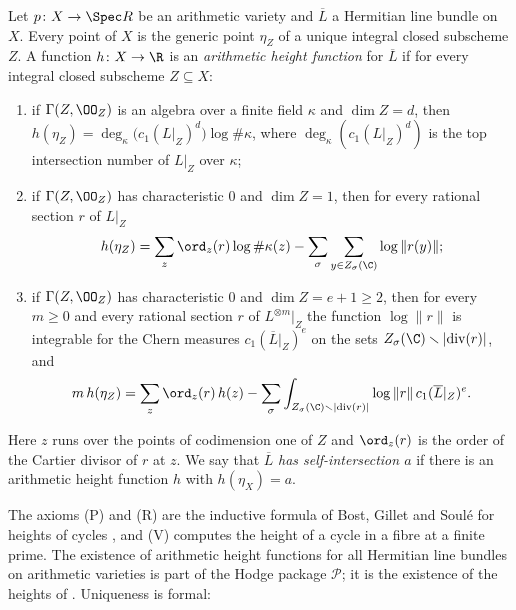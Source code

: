 \begin{definition}\label{pf:covol:def:height}
Let $p\colon X\to\Spec R$ be an arithmetic variety and $\overline L$ a Hermitian line bundle on $X$.
Every point of $X$ is the generic point $\eta_Z$ of a unique integral closed subscheme $Z$. A function
$h\colon X\to\R$ is an \emph{arithmetic height function} for $\overline L$ if for every integral closed
subscheme $Z\subseteq X$:
\begin{enumerate}[label=(\Alph*)]
\item[(V)] if $\Gamma(Z,\OO_Z)$ is an algebra over a finite field $\kappa$ and $\dim Z=d$, then
  $h(\eta_Z)=\deg_\kappa\bigl(c_1(L|_Z)^d\bigr)\log\#\kappa$, where $\deg_\kappa(c_1(L|_Z)^d)$ is the
  top intersection number of $L|_Z$ over $\kappa$;
\item[(P)] if $\Gamma(Z,\OO_Z)$ has characteristic $0$ and $\dim Z=1$, then for every rational section
  $r$ of $L|_Z$
  \[
  h(\eta_Z)=\sum_{z}\ord_z(r)\log\#\kappa(z)-\sum_{\sigma}\sum_{y\in Z_\sigma(\C)}\log\|r(y)\|;
  \]
\item[(R)] if $\Gamma(Z,\OO_Z)$ has characteristic $0$ and $\dim Z=e+1\ge2$, then for every $m\ge0$
  and every rational section $r$ of $L^{\otimes m}|_Z$ the function $\log\|r\|$ is integrable for the
  Chern measures $c_1(\overline L|_Z)^{e}$ on the sets $Z_\sigma(\C)\smallsetminus|\mathrm{div}(r)|$, and
  \begin{equation}\label{pf:covol:eq:recursion}
  m\,h(\eta_Z)=\sum_z\ord_z(r)\,h(z)-\sum_\sigma\int_{Z_\sigma(\C)\smallsetminus|\mathrm{div}(r)|}
  \log\|r\|\,c_1(\overline L|_Z)^{e}.
  \end{equation}
\end{enumerate}
Here $z$ runs over the points of codimension one of $Z$ and $\ord_z(r)$ is the order of the Cartier
divisor of $r$ at $z$. We say that $\overline L$ \emph{has self-intersection $a$} if there is an
arithmetic height function $h$ with $h(\eta_X)=a$.
\end{definition}

The axioms (P) and (R) are the inductive formula of Bost, Gillet and Soul\'e for heights of cycles
\cite[\S3]{BostGilletSoule1994}, and (V) computes the height of a cycle in a fibre at a finite
prime. The existence of arithmetic height functions for all Hermitian line bundles on arithmetic
varieties is part of the Hodge package $\mathcal P$; it is the existence of the heights of
\cite{GilletSoule1990,BostGilletSoule1994}. Uniqueness is formal:

